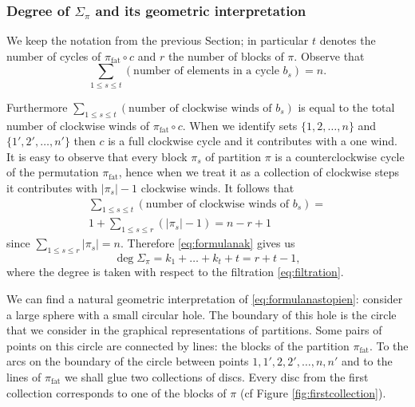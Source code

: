 \documentclass[12pt,dvips]{amsart}
\numberwithin{equation}{section} \numberwithin{figure}{section}
\theoremstyle{plain}
\theoremstyle{definition}
\theoremstyle{remark}
\DeclareMathOperator{\fat}{fat}
\begin{document}
\subsubsection{Degree of\/ $\Sigma_\pi$ and its geometric
interpretation} We keep the notation from the previous Section; in
particular $t$ denotes the number of cycles of $\pi_{\fat}\circ c$
and $r$ the number of blocks of $\pi$. Observe that
$$\sum_{1\leq s\leq t} (\text{number of elements in a cycle } b_s)=n.$$

Furthermore $\sum_{1\leq s\leq t} (\text{number of clockwise winds
of } b_s)$ is equal to the total number of clockwise winds of
$\pi_{\fat}\circ c$. When we identify sets $\{1,2,\dots,n\}$ and
$\{1',2',\dots,n'\}$ then $c$ is a full clockwise cycle and it
contributes with a one wind. It is easy to observe that every block
$\pi_s$ of partition $\pi$ is a counterclockwise cycle of the
permutation $\pi_{\fat}$, hence when we treat it as a collection of
clockwise steps it contributes with $|\pi_s|-1$ clockwise winds.  It
follows that
\begin{multline*}\sum_{1\leq s\leq t} (\text{number of clockwise winds of } b_s)=\\
1+\sum_{1\leq s\leq r} (|\pi_s|-1)=n-r+1
\end{multline*}
since $\sum_{1\leq s\leq r} |\pi_s|=n$. Therefore
\eqref{eq:formulanak} gives us
\begin{equation}
\label{eq:formulanastopien} \deg \Sigma_{\pi}=
k_1+\dots+k_t+t=r+t-1,
\end{equation}
where the degree is taken with respect to the filtration
\eqref{eq:filtration}.


\label{subsec:zaklejanie} We can find a natural geometric
interpretation of \eqref{eq:formulanastopien}: consider a large
sphere with a small circular hole. The boundary of this hole is the
circle that we consider in the graphical representations of
partitions. Some pairs of points on this circle are connected by
lines: the blocks of the partition $\pi_{\fat}$. To the arcs on the
boundary of the circle between points $1,1',2,2',\dots,n,n'$ and to
the lines of $\pi_{\fat}$ we shall glue two
 collections of discs. Every disc from the first collection
corresponds to one of the blocks of $\pi$ (cf Figure
\ref{fig:firstcollection}).
\end{document}
